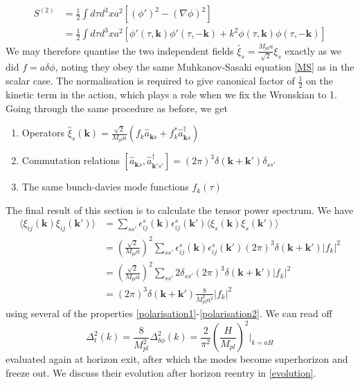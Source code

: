 \documentclass[a4paper,10pt]{article}
\renewcommand{\v}[1]{\mathbf{#1}}
\newcommand{\Mp}{M_{pl}}
\newcommand{\half}{\frac{1}{2}}
\newcommand{\anns}[2]{\hat{a}_{\v{#1}#2}}
\newcommand{\cres}[2]{\hat{a}^\dagger_{\v{#1}#2}}
\begin{document}
\begin{equation}\begin{split}
S^{(2)} &= \half \int d\tau d^3x a^2 [(\phi ' )^2 -(\nabla \phi)^2]\\
 &= \half \int d\tau d^3x a^2 [\phi'(\tau, \v{k})\phi'(\tau,\v{-k}) + k^2 \phi(\tau,\v{k})\phi(\tau,\v{-k})]
\end{split}\end{equation}
We may therefore quantise the two independent fields $\tilde{\xi_s} = \frac{\Mp a}{\sqrt{2}} \xi_s$ exactly as we did $ f = a \delta \phi$, noting they obey the same Muhkanov-Sasaki equation \ref{MS} as in the scalar case. The normalisation is required to give canonical factor of $\half$ on the kinetic term in the action, which plays a role when we fix the Wronskian to 1. Going through the same procedure as before, we get
\begin{enumerate}
\item{Operators $\hat{\xi}_s(\v{k}) = \frac{\sqrt{2}}{\Mp a}(f_k\anns{k}{s}+f_k^*\cres{k}{s})$}
\item{Commutation relations $[\anns{k}{s},\cres{k'}{s'}] = (2\pi)^3\delta(\v{k}+\v{k'})\delta_{ss'}$}
\item{The same bunch-davies mode functions $f_k(\tau)$}
\end{enumerate}
The final result of this section is to calculate the tensor power spectrum. We have
\begin{equation}\begin{split}
\langle\xi_{ij}(\v{k})\xi_{ij}(\v{k'})\rangle & = \sum_{ss'} \epsilon^s_{ij}(\v{k})\epsilon^s_{ij}(\v{k'})\langle\xi_{s}(\v{k})\xi_{s}(\v{k'})\rangle\\
&= (\frac{\sqrt{2}}{\Mp a})^2 \sum_{ss'} \epsilon^s_{ij}(\v{k})\epsilon^s_{ij}(\v{k'})(2\pi)^3\delta(\v{k}+\v{k'})|f_k|^2\\
&= (\frac{\sqrt{2}}{\Mp a})^2 \sum_{ss'} 2\delta_{ss'}(2\pi)^3\delta(\v{k}+\v{k'})|f_k|^2\\
&= (2\pi)^3\delta(\v{k}+\v{k'})\frac{8}{\Mp^2a^2}|f_k|^2
\end{split}\end{equation}
using several of the properties \ref{polarisation1}-\ref{polarisation2}. We can read off 
\begin{equation}
\Delta^2_t(k)=\frac{8}{\Mp^2}\Delta^2_{\delta\phi}(k) = \frac{2}{\pi^2}\left(\frac{H}{\Mp}\right)^2 \rvert_{k=aH}
\end{equation}
evaluated again at horizon exit, after which the modes become superhorizon and freeze out. We discuss their evolution after horizon reentry in \ref{evolution}.
\end{document}
